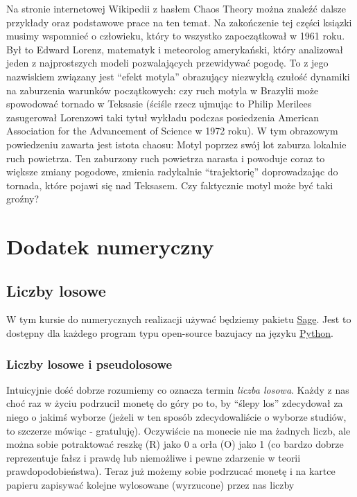 \documentclass[a4paper,12pt,polish]{sphinxmanual}
\makeatletter
\renewenvironment{notice}[2]{\begin{icsebox}\def\py@noticetype{#1}\par\strong{#2}}{\end{icsebox}}\makeatother
\makeatother
\begin{document}
Na stronie internetowej Wikipedii  z hasłem Chaos Theory  można znaleźć dalsze przykłady oraz podstawowe prace na ten temat. Na zakończenie tej części ksiązki musimy wspomnieć o człowieku, który to wszystko zapoczątkował w 1961 roku. Był to Edward Lorenz, matematyk i meteorolog amerykański,  który analizował jeden z najprostszych modeli pozwalających przewidywać pogodę. To z jego nazwiskiem związany jest  ``efekt motyla'' obrazujący niezwykłą czułość dynamiki na zaburzenia warunków  początkowych: czy ruch motyla w Brazylii może spowodować tornado w Teksasie (ściśle rzecz ujmując to Philip Merilees zasugerował  Lorenzowi taki tytuł wykładu podczas posiedzenia American Association for the Advancement of Science w 1972 roku). W tym obrazowym powiedzeniu zawarta jest istota chaosu: Motyl poprzez swój lot zaburza lokalnie ruch powietrza. Ten zaburzony ruch powietrza narasta i powoduje coraz to większe zmiany pogodowe, zmienia radykalnie ``trajektorię''  doprowadzając do tornada, które pojawi się nad Teksasem. Czy faktycznie motyl może być  taki groźny?


\chapter{Dodatek numeryczny}
\label{index:dodatek-numeryczny}

\section{Liczby losowe}
\label{ch5/chV011:liczby-losowe}\label{ch5/chV011::doc}
\begin{notice}{note}{Uwaga:}
W tym kursie do numerycznych realizacji używać będziemy pakietu \href{http://sagemath.org/}{Sage}. Jest to dostępny dla
każdego program typu open-source bazujacy na języku \href{http://python.org/}{Python}.
\end{notice}


\subsection{Liczby losowe i pseudolosowe}
\label{ch5/chV011:liczby-losowe-i-pseudolosowe}
Intuicyjnie dość dobrze rozumiemy co oznacza termin \emph{liczba losowa}. Każdy z nas choć
raz w życiu podrzucił monetę do góry po to, by ``ślepy los'' zdecydował za niego o jakimś
wyborze (jeżeli w ten sposób zdecydowaliście o wyborze studiów, to szczerze mówiąc -
gratuluję). Oczywiście na monecie nie ma żadnych liczb, ale można sobie potraktować
reszkę (R) jako 0 a orła (O) jako 1 (co bardzo dobrze reprezentuje fałsz i prawdę lub niemożliwe
i pewne zdarzenie w teorii prawdopodobieństwa). Teraz już możemy sobie podrzucać monetę
i na kartce papieru zapisywać kolejne wylosowane (wyrzucone) przez nas liczby
\end{document}
